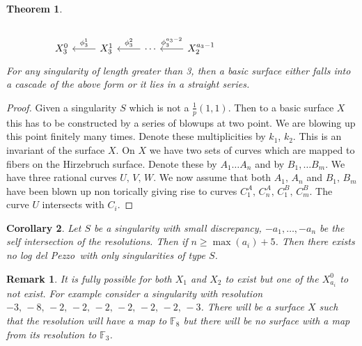 \documentclass[11pt]{amsbook}
\theoremstyle{plain}
\newtheorem{thm}{Theorem}[section]
\newtheorem{cor}[thm]{Corollary}
\newtheorem*{rem}{Remark}
\newcommand{\ldp}{log del Pezzo}
\newcommand{\mb}[1]{\mathbb{#1}}
\begin{document}
\begin{thm}
\[\begin{tikzcd}
        &                                  &                                &                                                                 &  &                                                                    &                          &                          \\
X_{3}^0 & X_{3}^1 \arrow[l, "\phi_{3}^1"'] & \cdots \arrow[l, "\phi_{3}^2"'] & X_{2}^{a_3-1} \arrow[l, "\phi_{3}^{a_3-2}"']                    &  &                                                                    &                          &                         
\end{tikzcd}
\]
For any singularity of length greater than 3, then a basic surface either falls into a cascade of the above form or it lies in a straight series.

\end{thm}
\begin{proof}
Given a singularity $S$ which is not a $\frac{1}{p}(1,1)$. Then to a basic surface $X$ this has to be constructed by a series of blowups at two point. We are blowing up this point finitely many times. Denote these multiplicities by $k_1$, $k_2$. This is an invariant of the surface $X$. On $X$ we have two sets of curves which are mapped to fibers on the Hirzebruch surface. Denote these by $A_1 \dots A_n$ and by $B_1, \dots B_m$. We have three rational curves $U, \, V, \, W$. We now assume that both $A_1, \, A_n$ and $B_1, \, B_m$ have been blown up non torically giving rise to curves $C_1^A, \, C_n^A, \, C_1^B, \, C_m^B$. The curve $U$ intersects with $C_i$.
\end{proof}
\begin{cor}
Let $S$ be a singularity with small discrepancy, $-a_1, \dots , -a_n$ be the self intersection of the resolutions. Then if $n \geq \max (a_i) + 5 $. Then there exists no \ldp\ with only singularities of type $S$.
\end{cor}
\begin{rem}
It is fully possible for both $X_1$ and $X_2$ to exist but one of the $X_{a_i}^0$ to not exist. For example consider a singularity with resolution $-3, \, -8, \, -2, \, -2, \, -2, \, -2, \, -2, \, -2, \, -3$. There will be a surface $X$ such that the resolution will have a map to $\mb{F}_8$ but there will be no surface with a map from its resolution to $\mb{F}_3$.
\end{rem}
\end{document}

